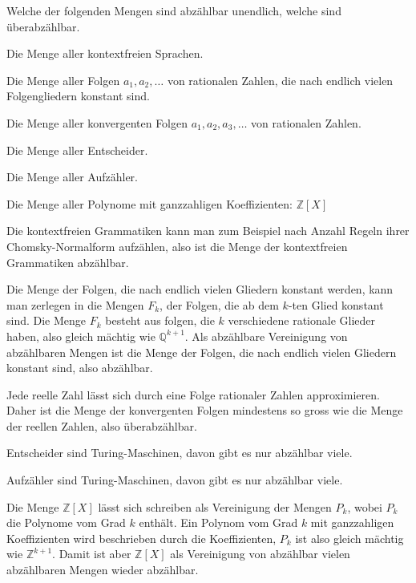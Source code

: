 Welche der folgenden Mengen sind abzählbar unendlich, welche sind
überabzählbar.
\begin{teilaufgaben}
\item Die Menge aller kontextfreien Sprachen.
\item Die Menge aller Folgen $a_1,a_2,\dots$ von rationalen Zahlen,
die nach endlich vielen Folgengliedern konstant sind.
\item Die Menge aller konvergenten Folgen $a_1,a_2,a_3,\dots$ von
rationalen Zahlen.
\item Die Menge aller Entscheider.
\item Die Menge aller Aufzähler.
\item Die Menge aller Polynome mit ganzzahligen Koeffizienten:
${\mathbb Z}[X]$
\end{teilaufgaben}

\begin{loesung}
\begin{teilaufgaben}
\item Die kontextfreien Grammatiken kann man zum Beispiel nach
Anzahl Regeln ihrer Chomsky-Normalform aufzählen, also ist
die Menge der kontextfreien Grammatiken abzählbar.
\item Die Menge der Folgen, die nach endlich vielen Gliedern konstant
werden, kann man zerlegen in die Mengen $F_k$, der Folgen, die ab dem
$k$-ten Glied konstant sind. Die Menge $F_k$ besteht aus folgen, die
$k$ verschiedene rationale Glieder haben, also gleich mächtig wie
$\mathbb Q^{k+1}$. Als abzählbare Vereinigung von abzählbaren Mengen
ist die Menge der Folgen, die nach endlich vielen Gliedern konstant sind,
also abzählbar.
\item Jede reelle Zahl lässt sich durch eine Folge rationaler Zahlen
approximieren. Daher ist die Menge der konvergenten Folgen mindestens
so gross wie die Menge der reellen Zahlen, also überabzählbar.
\item Entscheider sind Turing-Maschinen, davon gibt es nur abzählbar viele.
\item Aufzähler sind Turing-Maschinen, davon gibt es nur abzählbar viele.
\item Die Menge ${\mathbb Z}[X]$ lässt sich schreiben als Vereinigung
der Mengen $P_k$, wobei $P_k$ die Polynome vom Grad $k$ enthält.
Ein Polynom vom Grad $k$ mit ganzzahligen Koeffizienten wird beschrieben
durch die Koeffizienten, $P_k$ ist also gleich mächtig wie $\mathbb Z^{k+1}$.
Damit ist aber ${\mathbb Z}[X]$ als Vereinigung von abzählbar vielen
abzählbaren Mengen wieder abzählbar.
\qedhere
\end{teilaufgaben}
\end{loesung}

